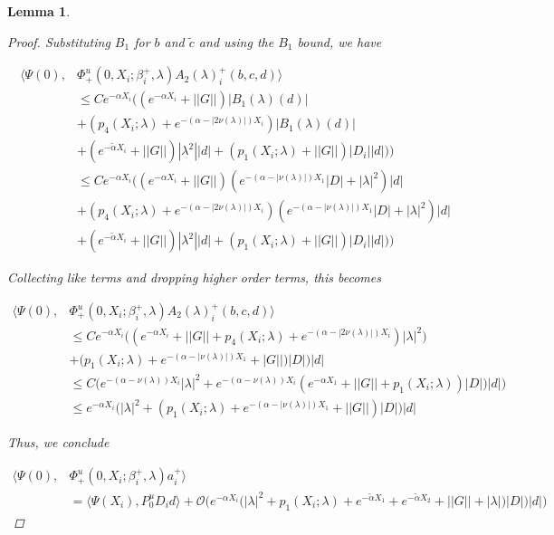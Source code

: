 \documentclass[12pt]{article}
\newtheorem{lemma}{Lemma}
\begin{document}
\begin{lemma}
\begin{proof}
Substituting $B_1$ for $b$ and $\tilde{c}$ and using the $B_1$ bound, we have

\begin{align*}
\langle \Psi(0), &\Phi^u_+(0, X_i; \beta_i^+, \lambda) A_2(\lambda)_i^+(b,c,d) \rangle \\
&\leq C e^{-\alpha X_i}  \Big( (e^{-\alpha X_i} + ||G||)|B_1(\lambda)(d)| \\
&+ ( p_4(X_i; \lambda) + e^{-(\alpha - |2 \nu(\lambda)|)X_i} )|B_1(\lambda)(d)| \\
&+ (e^{-\tilde{\alpha} X_i} + ||G||) |\lambda^2| |d| +(p_1(X_i; \lambda) + ||G|| )|D_i||d|) \Big) \\
&\leq C e^{-\alpha X_i}  \Big( (e^{-\alpha X_i} + ||G||)( e^{-(\alpha - |\nu(\lambda)|) X_1} |D| + |\lambda|^2 )|d| \\
&+ ( p_4(X_i; \lambda) + e^{-(\alpha - |2 \nu(\lambda)|)X_i} )( e^{-(\alpha - |\nu(\lambda)|) X_1} |D| + |\lambda|^2 )|d| \\
&+ (e^{-\tilde{\alpha} X_i} + ||G||) |\lambda^2| |d| +(p_1(X_i; \lambda) + ||G|| )|D_i||d|) \Big) 
\end{align*}

Collecting like terms and dropping higher order terms, this becomes

\begin{align*}
\langle \Psi(0), &\Phi^u_+(0, X_i; \beta_i^+, \lambda) A_2(\lambda)_i^+(b,c,d) \rangle \\
&\leq C e^{-\alpha X_i} \Big( (e^{-\alpha X_i} + ||G|| + p_4(X_i; \lambda) + e^{-(\alpha - |2 \nu(\lambda)|)X_i} ) |\lambda|^2 ) \\
&+ (p_1(X_i; \lambda) + e^{-(\alpha - |\nu(\lambda)|) X_1} + |G|| )|D| \Big)|d| \\
&\leq C \Big( e^{-(\alpha - \nu(\lambda)) X_i} |\lambda|^2 
+ e^{-(\alpha - \nu(\lambda)) X_i}( e^{-\alpha X_1} + ||G|| + p_1(X_i; \lambda))|D| )|d| \Big) \\
&\leq e^{-\alpha X_i} \Big( |\lambda|^2  + (p_1(X_i; \lambda) + e^{-(\alpha - |\nu(\lambda)|) X_1} + ||G|| )|D| \Big)|d| 
\end{align*}

Thus, we conclude

\begin{align*}
\langle \Psi(0), &\Phi^u_+(0, X_i; \beta_i^+, \lambda) a_i^+ \rangle \\
&= \langle \Psi(X_i), P^u_0 D_i d \rangle + \mathcal{O}\Big(e^{-\alpha X_i} \Big( |\lambda|^2  + p_1(X_i; \lambda) + e^{-\tilde{\alpha} X_1} + e^{-\tilde{\alpha} X_2}+ ||G|| + |\lambda|)|D| \Big)|d| \Big)
\end{align*}


\end{proof}
\end{lemma}
\end{document}
